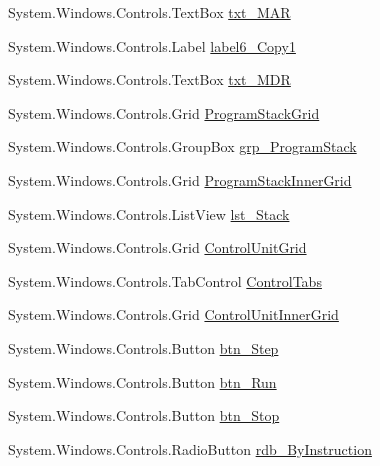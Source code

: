 \begin{DoxyCompactItemize}
System.\+Windows.\+Controls.\+Text\+Box \hyperlink{class_c_p_u___o_s___simulator_1_1_main_window_a87f8440246e9f6ace0aa4d69b5bba289}{txt\+\_\+\+M\+A\+R}
\item 
System.\+Windows.\+Controls.\+Label \hyperlink{class_c_p_u___o_s___simulator_1_1_main_window_a890bd54d36af19ec881b6a840d6ac8a9}{label6\+\_\+\+Copy1}
\item 
System.\+Windows.\+Controls.\+Text\+Box \hyperlink{class_c_p_u___o_s___simulator_1_1_main_window_a1aa53d1512aa84e476b3649dcda5ced0}{txt\+\_\+\+M\+D\+R}
\item 
System.\+Windows.\+Controls.\+Grid \hyperlink{class_c_p_u___o_s___simulator_1_1_main_window_a59373e8f8822e4efea670d9fb87a1b32}{Program\+Stack\+Grid}
\item 
System.\+Windows.\+Controls.\+Group\+Box \hyperlink{class_c_p_u___o_s___simulator_1_1_main_window_a10687b397ff3a0381a556096a14ed0b0}{grp\+\_\+\+Program\+Stack}
\item 
System.\+Windows.\+Controls.\+Grid \hyperlink{class_c_p_u___o_s___simulator_1_1_main_window_a8c373866c86f6be0e7ef487a5ccb8c3c}{Program\+Stack\+Inner\+Grid}
\item 
System.\+Windows.\+Controls.\+List\+View \hyperlink{class_c_p_u___o_s___simulator_1_1_main_window_a8453db331c7cc1e7c1e711a06b2ec30c}{lst\+\_\+\+Stack}
\item 
System.\+Windows.\+Controls.\+Grid \hyperlink{class_c_p_u___o_s___simulator_1_1_main_window_af6e1d9a71f9501c02b62e8319ba11b5a}{Control\+Unit\+Grid}
\item 
System.\+Windows.\+Controls.\+Tab\+Control \hyperlink{class_c_p_u___o_s___simulator_1_1_main_window_acc893fc507d9ea08cc4a923bdc23091d}{Control\+Tabs}
\item 
System.\+Windows.\+Controls.\+Grid \hyperlink{class_c_p_u___o_s___simulator_1_1_main_window_a0bb4b4233380c349ee3bef69813a684b}{Control\+Unit\+Inner\+Grid}
\item 
System.\+Windows.\+Controls.\+Button \hyperlink{class_c_p_u___o_s___simulator_1_1_main_window_acd572aa9d278af703febb634fc1c34a3}{btn\+\_\+\+Step}
\item 
System.\+Windows.\+Controls.\+Button \hyperlink{class_c_p_u___o_s___simulator_1_1_main_window_ab3286e931d7154605876654bbf092840}{btn\+\_\+\+Run}
\item 
System.\+Windows.\+Controls.\+Button \hyperlink{class_c_p_u___o_s___simulator_1_1_main_window_a1b6b541d9765ca230f537d1d6b6c83aa}{btn\+\_\+\+Stop}
\item 
System.\+Windows.\+Controls.\+Radio\+Button \hyperlink{class_c_p_u___o_s___simulator_1_1_main_window_acba6218f7f716645443533815c6bd7a3}{rdb\+\_\+\+By\+Instruction}

\end{DoxyCompactItemize}
